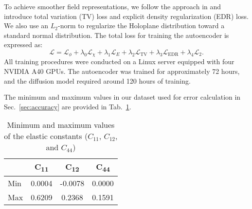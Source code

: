 To achieve smoother field representations, we follow the approach in \cite{Shue2023} and introduce total variation (TV) loss and explicit density regularization (EDR) loss. 
We also use an $L_2$-norm to regularize the Holoplane distribution toward a standard normal distribution. 
The total loss for training the autoencoder is expressed as:
\begin{equation}
    \mathcal{L} = \mathcal{L}_\phi + 
                  \lambda_{0}\mathcal{L}_{\chi} + 
                  \lambda_{1}\mathcal{L}_{E} + 
                  \lambda_{2}\mathcal{L}_{\text{TV}} + 
                  \lambda_{3}\mathcal{L}_{\text{EDR}} + 
                  \lambda_{4}\mathcal{L}_{2}.
\end{equation}
All training procedures were conducted on a Linux server equipped with four NVIDIA A40 GPUs.
The autoencoder was trained for approximately 72 hours, and the diffusion model required around 120 hours of training.

The minimum and maximum values in our dataset used for error calculation in Sec.~\ref{sec:accuracy} are provided in Tab.~\ref{tab:min_max}.
\begin{table}[ht]
    \centering
    \caption{Minimum and maximum values of the elastic constants ($C_{11}$, $C_{12}$, and $C_{44}$)}
    \label{tab:min_max}
    \begin{tabular}{lccc}
        \toprule
                        & C\textsubscript{11} & C\textsubscript{12} & C\textsubscript{44} \\
        \midrule
        Min             & 0.0004 & -0.0078 & 0.0000 \\
        Max             & 0.6209 & 0.2368 & 0.1591 \\
        \bottomrule
    \end{tabular}
\end{table}

